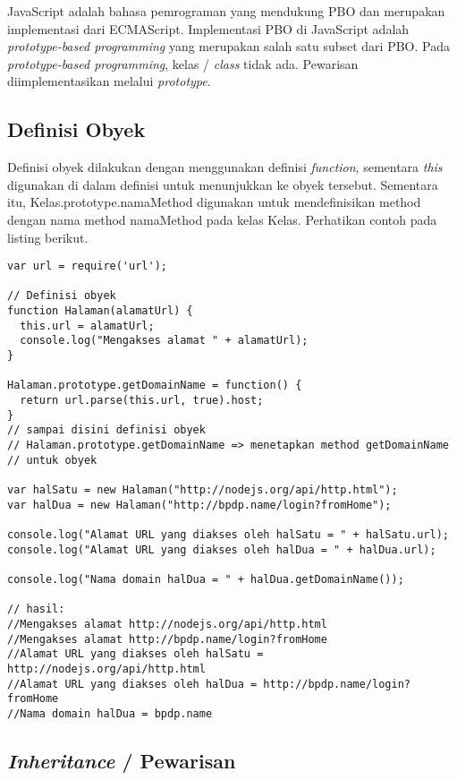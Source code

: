 JavaScript adalah bahasa pemrograman yang mendukung PBO dan merupakan implementasi dari ECMAScript. Implementasi PBO di JavaScript adalah \textit{prototype-based programming} yang merupakan salah satu subset dari PBO. Pada \textit{prototype-based programming}, kelas / \textit{class} tidak ada. Pewarisan diimplementasikan melalui \textit{prototype}.

\subsection{Definisi Obyek}

Definisi obyek dilakukan dengan menggunakan definisi \textit{function}, sementara \textit{this} digunakan di dalam definisi untuk menunjukkan ke obyek tersebut. Sementara itu, Kelas.prototype.namaMethod digunakan untuk mendefinisikan method dengan nama method namaMethod pada kelas Kelas. Perhatikan contoh pada listing berikut.

\lstset{language=JavaScript,caption=Definisi obyek di JavaScript}
\begin{lstlisting}
var url = require('url');

// Definisi obyek
function Halaman(alamatUrl) {
  this.url = alamatUrl;
  console.log("Mengakses alamat " + alamatUrl);
}

Halaman.prototype.getDomainName = function() {
  return url.parse(this.url, true).host; 
}
// sampai disini definisi obyek
// Halaman.prototype.getDomainName => menetapkan method getDomainName
// untuk obyek

var halSatu = new Halaman("http://nodejs.org/api/http.html");
var halDua = new Halaman("http://bpdp.name/login?fromHome");

console.log("Alamat URL yang diakses oleh halSatu = " + halSatu.url);
console.log("Alamat URL yang diakses oleh halDua = " + halDua.url);

console.log("Nama domain halDua = " + halDua.getDomainName());

// hasil:
//Mengakses alamat http://nodejs.org/api/http.html
//Mengakses alamat http://bpdp.name/login?fromHome
//Alamat URL yang diakses oleh halSatu = http://nodejs.org/api/http.html
//Alamat URL yang diakses oleh halDua = http://bpdp.name/login?fromHome
//Nama domain halDua = bpdp.name
\end{lstlisting}

\subsection{\textit{Inheritance} / Pewarisan}

